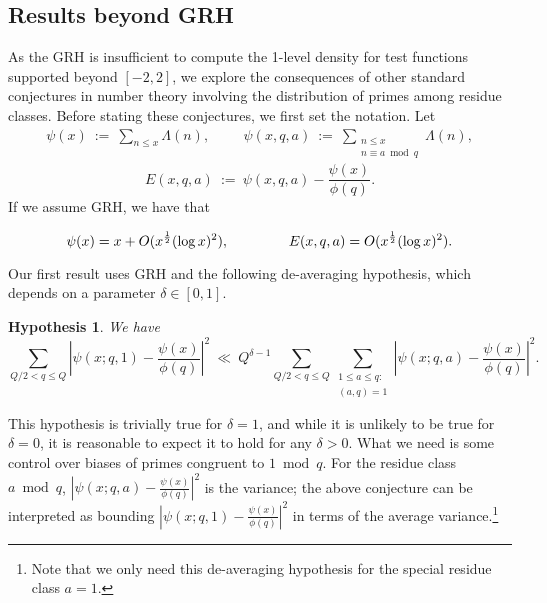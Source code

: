 \documentclass[12pt,reqno]{amsart}
\numberwithin{equation}{section}
\theoremstyle{plain}
\newtheorem{hypothesis}[thm]{Hypothesis}
\begin{document}
\subsection{Results beyond GRH}\label{sec:resultsbeyondGRH}

As the GRH is insufficient to compute the 1-level density for test functions supported beyond $[-2, 2]$, we explore the consequences of other standard conjectures in number theory involving the distribution of primes among residue classes. Before stating these conjectures, we first set the notation. Let
\begin{eqnarray} \psi(x)\ :=\  \sum_{n \le x} \Lambda(n), \hspace{1cm}  \psi(x,q,a)\ :=\ \sum_{\substack{n \le x \\ n \equiv a \bmod q}} \Lambda(n), \end{eqnarray}
\begin{equation}  E(x,q,a) \ :=\  \psi(x,q,a) -
\frac{\psi(x)}{\phi(q)}.\end{equation} If we assume GRH, we have that

\begin{equation}
\label{eq:GRHbounds} \psi(x) = x + O(x^{\frac 12}(\log x)^2), \hspace{1.5cm} E(x,q,a)  = O(x^{\frac 12} (\log x)^2).
\end{equation}

Our first result uses GRH and the following de-averaging hypothesis, which depends on a parameter $\delta \in [0,1]$.

\begin{hypothesis}\label{de-averaging hypothesis}
We have
\begin{equation}\label{eq:deavehypotheta} \sum_{Q/2<q\leq Q}\left|\psi(x;q,1) - \frac{\psi(x)}{\phi(q)} \right|^2\ \ll\ Q^{\delta-1} \sum_{Q/2<q\leq Q} \sum_{\substack{1\leq a \leq q : \\ (a,q)=1}} \left| \psi(x;q,a) - \frac{\psi(x)}{\phi(q)}\right|^2.\end{equation}
\end{hypothesis}

This hypothesis is trivially true for $\delta = 1$, and while it is unlikely to be true for $\delta = 0$, it is reasonable to expect it to hold for any $\delta>0$. What we need is some control over biases of primes congruent to $1 \bmod q$. For the residue class $a \bmod q$,
$\left|\psi(x;q,a) - \frac{\psi(x)}{\phi(q)}\right|^2$ is the variance; the above conjecture can be
interpreted as bounding $\left|\psi(x;q,1) - \frac{\psi(x)}{\phi(q)}\right|^2$ in terms of the average
variance.\footnote{Note that we only need this de-averaging hypothesis for the special residue class $a=1$. }
\end{document}
